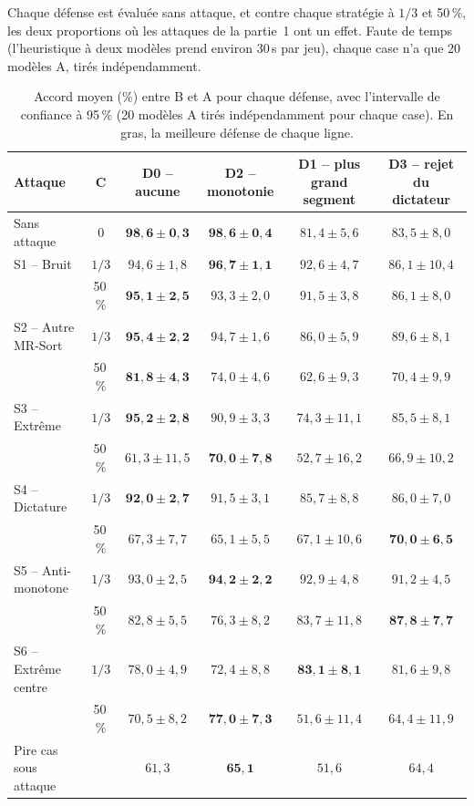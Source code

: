 \documentclass[11pt,a4paper]{article}
\begin{document}
Chaque défense est évaluée sans attaque, et contre chaque stratégie à $1/3$ et 50\,\%, les deux proportions où
les attaques de la partie~1 ont un effet. Faute de temps (l'heuristique à deux modèles prend environ 30\,s par
jeu), chaque case n'a que 20 modèles A, tirés indépendamment.

\begin{table}[h]
\centering
\small
\begin{tabularx}{\textwidth}{>{\raggedright\arraybackslash}p{3.3cm}cCCCC}
\toprule
Attaque & C & D0 -- aucune & D2 -- monotonie & D1 -- plus grand segment & D3 -- rejet du dictateur \\
\midrule
Sans attaque         & 0       & $\mathbf{98{,}6 \pm 0{,}3}$ & $\mathbf{98{,}6 \pm 0{,}4}$ & $81{,}4 \pm 5{,}6$ & $83{,}5 \pm 8{,}0$ \\
\midrule
S1 -- Bruit          & $1/3$   & $94{,}6 \pm 1{,}8$ & $\mathbf{96{,}7 \pm 1{,}1}$ & $92{,}6 \pm 4{,}7$ & $86{,}1 \pm 10{,}4$ \\
                     & 50\,\%  & $\mathbf{95{,}1 \pm 2{,}5}$ & $93{,}3 \pm 2{,}0$ & $91{,}5 \pm 3{,}8$ & $86{,}1 \pm 8{,}0$ \\
S2 -- Autre MR-Sort  & $1/3$   & $\mathbf{95{,}4 \pm 2{,}2}$ & $94{,}7 \pm 1{,}6$ & $86{,}0 \pm 5{,}9$ & $89{,}6 \pm 8{,}1$ \\
                     & 50\,\%  & $\mathbf{81{,}8 \pm 4{,}3}$ & $74{,}0 \pm 4{,}6$ & $62{,}6 \pm 9{,}3$ & $70{,}4 \pm 9{,}9$ \\
S3 -- Extrême        & $1/3$   & $\mathbf{95{,}2 \pm 2{,}8}$ & $90{,}9 \pm 3{,}3$ & $74{,}3 \pm 11{,}1$ & $85{,}5 \pm 8{,}1$ \\
                     & 50\,\%  & $61{,}3 \pm 11{,}5$ & $\mathbf{70{,}0 \pm 7{,}8}$ & $52{,}7 \pm 16{,}2$ & $66{,}9 \pm 10{,}2$ \\
S4 -- Dictature      & $1/3$   & $\mathbf{92{,}0 \pm 2{,}7}$ & $91{,}5 \pm 3{,}1$ & $85{,}7 \pm 8{,}8$ & $86{,}0 \pm 7{,}0$ \\
                     & 50\,\%  & $67{,}3 \pm 7{,}7$ & $65{,}1 \pm 5{,}5$ & $67{,}1 \pm 10{,}6$ & $\mathbf{70{,}0 \pm 6{,}5}$ \\
S5 -- Anti-monotone  & $1/3$   & $93{,}0 \pm 2{,}5$ & $\mathbf{94{,}2 \pm 2{,}2}$ & $92{,}9 \pm 4{,}8$ & $91{,}2 \pm 4{,}5$ \\
                     & 50\,\%  & $82{,}8 \pm 5{,}5$ & $76{,}3 \pm 8{,}2$ & $83{,}7 \pm 11{,}8$ & $\mathbf{87{,}8 \pm 7{,}7}$ \\
S6 -- Extrême centre & $1/3$   & $78{,}0 \pm 4{,}9$ & $72{,}4 \pm 8{,}8$ & $\mathbf{83{,}1 \pm 8{,}1}$ & $81{,}6 \pm 9{,}8$ \\
                     & 50\,\%  & $70{,}5 \pm 8{,}2$ & $\mathbf{77{,}0 \pm 7{,}3}$ & $51{,}6 \pm 11{,}4$ & $64{,}4 \pm 11{,}9$ \\
\midrule
Pire cas sous attaque &        & $61{,}3$ & $\mathbf{65{,}1}$ & $51{,}6$ & $64{,}4$ \\
\bottomrule
\end{tabularx}
\caption{Accord moyen (\%) entre B et A pour chaque défense, avec l'intervalle de confiance à 95\,\% (20 modèles A
tirés indépendamment pour chaque case). En gras, la meilleure défense de chaque ligne.}
\label{tab:defenses}
\end{table}
\end{document}
